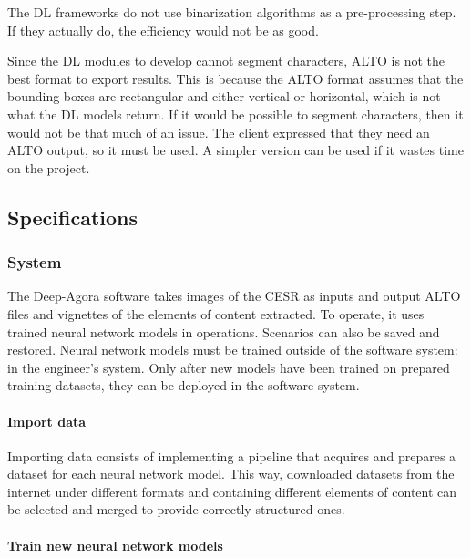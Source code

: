 \documentclass{polytech/polytech}
\numberwithin{figure}{chapter}
\begin{document}
The DL frameworks do not use binarization algorithms as a pre-processing step.
If they actually do, the efficiency would not be as good.

Since the DL modules to develop cannot segment characters, ALTO is not the best format to export results.
This is because the ALTO format assumes that the bounding boxes are rectangular and either vertical or horizontal, which is not what the DL models return.
If it would be possible to segment characters, then it would not be that much of an issue.
The client expressed that they need an ALTO output, so it must be used.
A simpler version can be used if it wastes time on the project.


\subsection{Specifications}

\subsubsection{System}

The Deep-Agora software takes images of the CESR as inputs and output ALTO files and vignettes of the elements of content extracted.
To operate, it uses trained neural network models in operations.
Scenarios can also be saved and restored.
Neural network models must be trained outside of the software system: in the engineer's system.
Only after new models have been trained on prepared training datasets, they can be deployed in the software system.
\\
\label{diagSysEnv}

\paragraph{Import data}

Importing data consists of implementing a pipeline that acquires and prepares a dataset for each neural network model.
This way, downloaded datasets from the internet under different formats and containing different elements of content can be selected and merged to provide correctly structured ones.

\paragraph{Train new neural network models}
\end{document}
